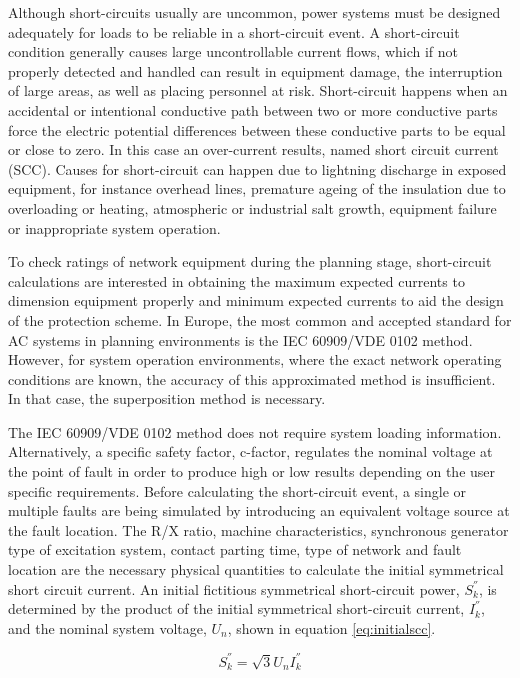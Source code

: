 Although short-circuits usually are uncommon, power systems must be designed adequately for loads to be reliable in a short-circuit event. A short-circuit condition generally causes large uncontrollable current flows, which if not properly detected and handled can result in equipment damage, the interruption of large areas, as well as placing personnel at risk. Short-circuit happens when an accidental or intentional conductive path between two or more conductive parts force the electric potential differences between these conductive parts to be equal or close to zero. In this case an over-current results, named short circuit current (SCC). Causes for short-circuit can happen due to lightning discharge in exposed equipment, for instance overhead lines, premature ageing of the insulation due to overloading or heating, atmospheric or industrial salt growth, equipment failure or inappropriate system operation.  
 
 To check ratings of network equipment during the planning stage, short-circuit calculations are interested in obtaining the maximum expected currents to dimension equipment properly and minimum expected currents to aid the design of the protection scheme. In Europe, the most common and accepted standard for AC systems in planning environments is the IEC 60909/VDE 0102 method. However, for system operation environments, where the exact network operating conditions are known, the accuracy of this approximated method is insufficient. In that case, the superposition method is necessary. 
 
The IEC 60909/VDE 0102 method does not require system loading information. Alternatively, a specific safety factor, c-factor, regulates the nominal voltage at the point of fault in order to produce high or low results depending on the user specific requirements. Before calculating the short-circuit event, a single or multiple faults are being simulated by introducing an equivalent voltage source at the fault location. The R/X ratio, machine characteristics, synchronous generator type of excitation system, contact parting time, type of network and fault location are the necessary physical quantities to calculate the initial symmetrical short circuit current. An initial fictitious symmetrical short-circuit power, $S_k^{''}$, is determined by the product of the initial symmetrical short-circuit current, $I_k^{''}$, and the nominal system voltage, $U_n$, shown in equation \ref{eq:initialscc}.

\begin{equation}
    S_k^{''} = \sqrt{3} U_n I_k^{''}
    \label{eq:initialscc}
\end{equation}

